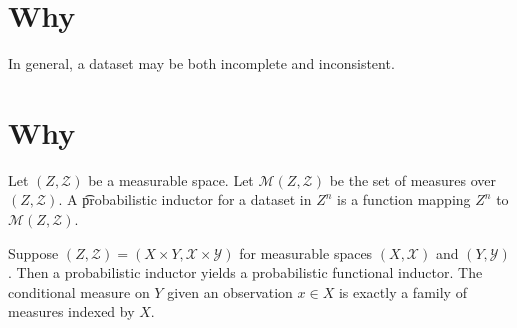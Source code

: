
\section*{Why}

In general, a dataset may be both incomplete and inconsistent.

\section*{Why}

Let $(Z, \mathcal{Z} )$ be a measurable space.
Let $\mathcal{M} (Z, \mathcal{Z} )$ be the set of measures over $(Z, \mathcal{Z} )$.
A \t{probabilistic inductor} for a dataset in $Z^n$ is a function mapping $Z^n$ to $\mathcal{M} (Z, \mathcal{Z} )$.

Suppose $(Z, \mathcal{Z} ) = (X \times  Y, \mathcal{X}  \times \mathcal{Y} )$ for measurable spaces $(X, \mathcal{X} )$ and $(Y, \mathcal{Y} )$.
Then a probabilistic inductor yields a probabilistic functional inductor.
The conditional measure on $Y$ given an observation $x \in X$ is exactly a family of measures indexed by $X$.

\blankpage